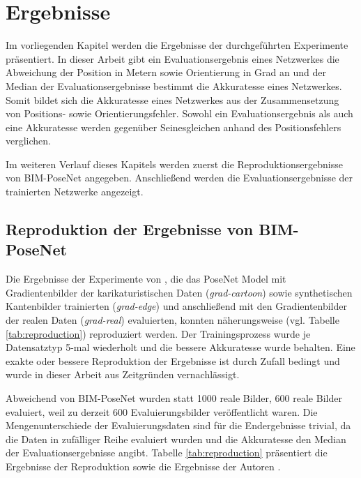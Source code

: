 
\section{Ergebnisse}
Im vorliegenden Kapitel werden die Ergebnisse der durchgeführten Experimente präsentiert. In dieser Arbeit gibt ein Evaluationsergebnis eines Netzwerkes die Abweichung der Position in Metern sowie Orientierung in Grad an und der Median der Evaluationsergebnisse bestimmt die Akkuratesse eines Netzwerkes. Somit bildet sich die Akkuratesse eines Netzwerkes aus der Zusammensetzung von Positions-  sowie Orientierungsfehler. Sowohl ein Evaluationsergebnis als auch eine Akkuratesse werden gegenüber Seinesgleichen anhand des Positionsfehlers verglichen.

Im weiteren Verlauf dieses Kapitels werden zuerst die Reproduktionsergebnisse von BIM-PoseNet \cite{acharyaBIMPoseNetIndoorCamera2019} angegeben. Anschließend werden die Evaluationsergebnisse der trainierten Netzwerke angezeigt.

\subsection{Reproduktion der Ergebnisse von BIM-PoseNet}
Die Ergebnisse der Experimente von \citet{acharyaBIMPoseNetIndoorCamera2019}, die das PoseNet Model mit Gradientenbilder der karikaturistischen Daten (\textit{grad-cartoon}) sowie synthetischen Kantenbilder trainierten (\textit{grad-edge}) und anschließend mit den Gradientenbilder der realen Daten (\textit{grad-real}) evaluierten, konnten näherungsweise (vgl. Tabelle \ref{tab:reproduction}) reproduziert werden. Der Trainingsprozess wurde je Datensatztyp 5-mal wiederholt und die bessere Akkuratesse wurde behalten. Eine exakte oder bessere Reproduktion der Ergebnisse ist durch Zufall bedingt und wurde in dieser Arbeit aus Zeitgründen vernachlässigt.

Abweichend von BIM-PoseNet wurden statt 1000 reale Bilder, 600 reale Bilder evaluiert, weil zu derzeit 600 Evaluierungsbilder veröffentlicht waren. Die Mengenunterschiede der Evaluierungsdaten sind für die Endergebnisse trivial, da die Daten in zufälliger Reihe evaluiert wurden und die Akkuratesse den Median der Evaluationsergebnisse angibt. Tabelle \ref{tab:reproduction} präsentiert die Ergebnisse der Reproduktion sowie die Ergebnisse der Autoren \citet{acharyaBIMPoseNetIndoorCamera2019}.


